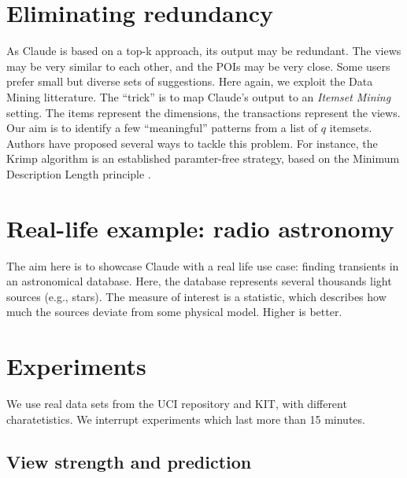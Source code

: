 \section{Eliminating redundancy}
As Claude is based on a top-k approach, its output may be redundant.  The views
may be very similar to each other, and the POIs may be very close.  Some users
prefer small but diverse sets of suggestions. Here again, we exploit the Data
Mining litterature. The ``trick'' is to map Claude's output to an \emph{Itemset
Mining} setting.  The items represent the dimensions, the transactions
represent the views. Our aim is to identify a few ``meaningful'' patterns from
a list of $q$ itemsets. Authors have proposed several ways to tackle this
problem. For instance, the Krimp algorithm is an established paramter-free
strategy, based on the Minimum Description Length principle
\cite{vreeken2011krimp}.


\section{Real-life example: radio astronomy}
The aim here is to showcase Claude with a real life use case: finding
transients in an astronomical database. Here, the database represents several
thousands light sources (e.g., stars). The measure of interest is a statistic,
which describes how much the sources deviate from some physical model. Higher
is better.


\section{Experiments}

We use real data sets from the UCI repository and KIT, with different
charatetistics. We interrupt experiments which last more than 15 minutes.

\subsection{View strength and prediction}

